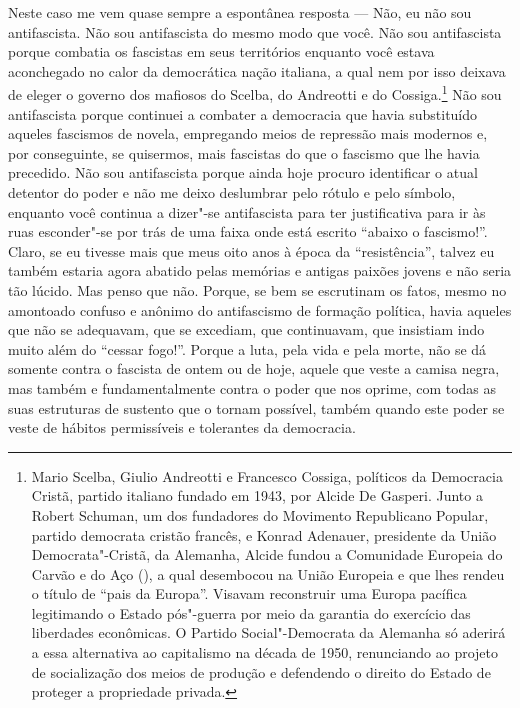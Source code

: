 Neste caso me vem quase sempre a espontânea resposta --- Não, eu não sou
antifascista. Não sou antifascista do mesmo modo que você. Não sou
antifascista porque combatia os fascistas em seus territórios enquanto
você estava aconchegado no calor da democrática nação italiana, a qual
nem por isso deixava de eleger o governo dos mafiosos do Scelba, do
Andreotti e do Cossiga.\footnote{Mario Scelba, Giulio Andreotti e Francesco Cossiga, políticos da
  Democracia Cristã, partido italiano fundado em 1943, por Alcide De
  Gasperi. Junto a Robert Schuman, um dos fundadores do Movimento
  Republicano Popular, partido democrata cristão francês, e Konrad
  Adenauer, presidente da União Democrata"-Cristã, da Alemanha, Alcide
  fundou a Comunidade Europeia do Carvão e do Aço (), a qual
  desembocou na União Europeia e que lhes rendeu o título de ``pais da
  Europa''. Visavam reconstruir uma Europa pacífica legitimando o Estado
  pós"-guerra por meio da garantia do exercício das liberdades
  econômicas. O Partido Social"-Democrata da Alemanha só aderirá a essa
  alternativa ao capitalismo na década de 1950, renunciando ao projeto
  de socialização dos meios de produção e defendendo o direito do Estado
  de proteger a propriedade privada.} Não sou antifascista porque continuei a combater a
democracia que havia substituído aqueles fascismos de novela, empregando
meios de repressão mais modernos e, por conseguinte, se quisermos, mais
fascistas do que o fascismo que lhe havia precedido. Não sou
antifascista porque ainda hoje procuro identificar o atual detentor do
poder e não me deixo deslumbrar pelo rótulo e pelo símbolo, enquanto
você continua a dizer"-se antifascista para ter justificativa para ir às
ruas esconder"-se por trás de uma faixa onde está escrito ``abaixo o
fascismo!''. Claro, se eu tivesse mais que meus oito anos à época da
``resistência'', talvez eu também estaria agora abatido pelas memórias e
antigas paixões jovens e não seria tão lúcido. Mas penso que não.
Porque, se bem se escrutinam os fatos, mesmo no amontoado confuso e
anônimo do antifascismo de formação política, havia aqueles que não se
adequavam, que se excediam, que continuavam, que insistiam indo muito
além do ``cessar fogo!''. Porque a luta, pela vida e pela morte, não se
dá somente contra o fascista de ontem ou de hoje, aquele que veste a
camisa negra, mas também e fundamentalmente contra o poder que nos
oprime, com todas as suas estruturas de sustento que o tornam possível,
também quando este poder se veste de hábitos permissíveis e tolerantes
da democracia.

